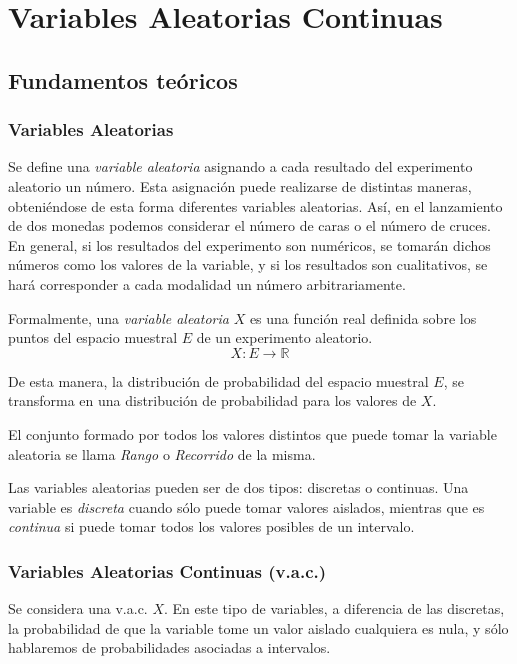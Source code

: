 
\chapter{Variables Aleatorias Continuas}

\section{Fundamentos teóricos}
\subsection{Variables Aleatorias}
Se define una \emph{variable aleatoria} asignando a cada resultado del experimento aleatorio un número.
Esta asignación puede realizarse de distintas maneras, obteniéndose de esta forma diferentes variables aleatorias.
Así, en el lanzamiento de dos monedas podemos considerar el número de caras o el número de cruces.
En general, si los resultados del experimento son numéricos, se tomarán dichos números como los valores de la variable,
y si los resultados son cualitativos, se hará corresponder a cada modalidad un número arbitrariamente.

Formalmente, una \emph{variable aleatoria} $X$ es una función real definida sobre los puntos del espacio muestral $E$ de
un experimento aleatorio. 
\[
X:E\rightarrow \mathbb{R}
\]

De esta manera, la distribución de probabilidad del espacio muestral $E$, se transforma en una distribución de
probabilidad para los valores de $X$.

El conjunto formado por todos los valores distintos que puede tomar la variable aleatoria se llama \emph{Rango} o
\emph{Recorrido} de la misma.

Las variables aleatorias pueden ser de dos tipos: discretas o continuas. Una variable es \emph{discreta} cuando sólo
puede tomar valores aislados, mientras que es \emph{continua} si puede tomar todos los valores posibles de un intervalo.

\subsection{Variables Aleatorias Continuas (v.a.c.)}
Se considera una v.a.c. $X$. En este tipo de variables, a diferencia de las discretas, la probabilidad de que la
variable tome un valor aislado cualquiera es nula, y sólo hablaremos de probabilidades asociadas a intervalos.

